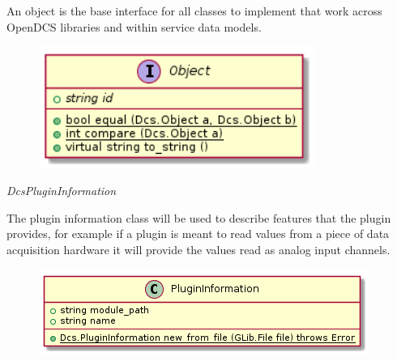       \vspace*{-0.75cm}
      \begin{minipage}[t]{0.5\textwidth}
      	\vspace*{0.5cm}
        An object is the base interface for all classes to implement that work
        across OpenDCS libraries and within service data models.
      \end{minipage} \hfill
      \begin{minipage}[t]{0.45\textwidth}
        \begin{figure}[H]
          \includegraphics[width=0.8\textwidth]{figures/design/class/core/object}
          \label{fig:dsg-classes-object}
        \end{figure}
      \end{minipage}

      \emph{DcsPluginInformation}

      \vspace*{-0.75cm}
      \begin{minipage}[t]{0.5\textwidth}
      	\vspace*{0.5cm}
        The plugin information class will be used to describe features that the
        plugin provides, for example if a plugin is meant to read values from a
        piece of data acquisition hardware it will provide the values read as
        analog input channels.
      \end{minipage} \hfill
      \begin{minipage}[t]{0.45\textwidth}
        \begin{figure}[H]
          \includegraphics[width=\textwidth]{figures/design/class/core/plugin-information}
          \label{fig:dsg-classes-plugin-information}
        \end{figure}
      \end{minipage}

